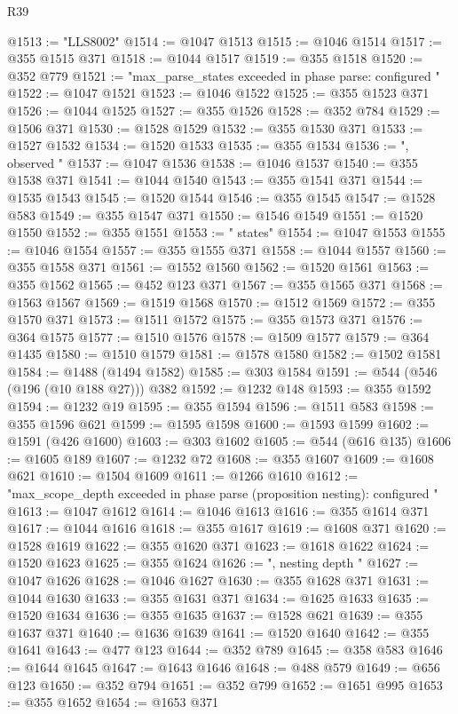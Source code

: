 \begin{lexlean}{R39}
\begin{coremodule}
@1513 := "LLS8002"
@1514 := @1047 @1513
@1515 := @1046 @1514
@1517 := @355 @1515 @371
@1518 := @1044 @1517
@1519 := @355 @1518
@1520 := @352 @779
@1521 := "max_parse_states exceeded in phase parse: configured "
@1522 := @1047 @1521
@1523 := @1046 @1522
@1525 := @355 @1523 @371
@1526 := @1044 @1525
@1527 := @355 @1526
@1528 := @352 @784
@1529 := @1506 @371
@1530 := @1528 @1529
@1532 := @355 @1530 @371
@1533 := @1527 @1532
@1534 := @1520 @1533
@1535 := @355 @1534
@1536 := ", observed "
@1537 := @1047 @1536
@1538 := @1046 @1537
@1540 := @355 @1538 @371
@1541 := @1044 @1540
@1543 := @355 @1541 @371
@1544 := @1535 @1543
@1545 := @1520 @1544
@1546 := @355 @1545
@1547 := @1528 @583
@1549 := @355 @1547 @371
@1550 := @1546 @1549
@1551 := @1520 @1550
@1552 := @355 @1551
@1553 := " states"
@1554 := @1047 @1553
@1555 := @1046 @1554
@1557 := @355 @1555 @371
@1558 := @1044 @1557
@1560 := @355 @1558 @371
@1561 := @1552 @1560
@1562 := @1520 @1561
@1563 := @355 @1562
@1565 := @452 @123 @371
@1567 := @355 @1565 @371
@1568 := @1563 @1567
@1569 := @1519 @1568
@1570 := @1512 @1569
@1572 := @355 @1570 @371
@1573 := @1511 @1572
@1575 := @355 @1573 @371
@1576 := @364 @1575
@1577 := @1510 @1576
@1578 := @1509 @1577
@1579 := @364 @1435
@1580 := @1510 @1579
@1581 := @1578 @1580
@1582 := @1502 @1581
@1584 := @1488 (@1494 @1582)
@1585 := @303 @1584
@1591 := @544 (@546 (@196 (@10 @188 @27))) @382
@1592 := @1232 @148
@1593 := @355 @1592
@1594 := @1232 @19
@1595 := @355 @1594
@1596 := @1511 @583
@1598 := @355 @1596 @621
@1599 := @1595 @1598
@1600 := @1593 @1599
@1602 := @1591 (@426 @1600)
@1603 := @303 @1602
@1605 := @544 (@616 @135)
@1606 := @1605 @189
@1607 := @1232 @72
@1608 := @355 @1607
@1609 := @1608 @621
@1610 := @1504 @1609
@1611 := @1266 @1610
@1612 := "max_scope_depth exceeded in phase parse (proposition nesting): configured "
@1613 := @1047 @1612
@1614 := @1046 @1613
@1616 := @355 @1614 @371
@1617 := @1044 @1616
@1618 := @355 @1617
@1619 := @1608 @371
@1620 := @1528 @1619
@1622 := @355 @1620 @371
@1623 := @1618 @1622
@1624 := @1520 @1623
@1625 := @355 @1624
@1626 := ", nesting depth "
@1627 := @1047 @1626
@1628 := @1046 @1627
@1630 := @355 @1628 @371
@1631 := @1044 @1630
@1633 := @355 @1631 @371
@1634 := @1625 @1633
@1635 := @1520 @1634
@1636 := @355 @1635
@1637 := @1528 @621
@1639 := @355 @1637 @371
@1640 := @1636 @1639
@1641 := @1520 @1640
@1642 := @355 @1641
@1643 := @477 @123
@1644 := @352 @789
@1645 := @358 @583
@1646 := @1644 @1645
@1647 := @1643 @1646
@1648 := @488 @579
@1649 := @656 @123
@1650 := @352 @794
@1651 := @352 @799
@1652 := @1651 @995
@1653 := @355 @1652
@1654 := @1653 @371

\end{coremodule}
\end{lexlean}
